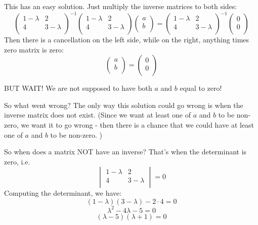\documentclass[12pt]{report}
\begin{document}
This has an easy solution. Just multiply the inverse matrices to both sides:
$$\begin{pmatrix} 1- \lambda &2 \\ 4& 3- \lambda\\ \end{pmatrix}^{-1} \begin{pmatrix} 1- \lambda &2 \\ 4& 3- \lambda\\ \end{pmatrix} \begin{pmatrix} a \\ b\\ \end{pmatrix} =  \begin{pmatrix} 1- \lambda &2 \\ 4& 3- \lambda\\ \end{pmatrix}^{-1} \begin{pmatrix} 0 \\ 0\\ \end{pmatrix} $$
Then there is a cancellation on the left side, while on the right, anything times zero matrix is zero:
$$\begin{pmatrix} a \\ b\\ \end{pmatrix} =  \begin{pmatrix} 0 \\ 0\\ \end{pmatrix} $$

BUT WAIT! We are not supposed to have both $a$ and $b$ equal to zero!

So what went wrong? The only way this solution could go wrong is when the inverse matrix does not exist. (Since we want at least one of $a$ and $b$ to be non-zero, we want it to go wrong - then there is a chance that we could have at least one of $a$ and $b$ to be non-zero. )

So when does a matrix NOT have an inverse? That's when the determinant is zero, i.e.
$$\begin{vmatrix} 1- \lambda &2 \\ 4& 3- \lambda\\ \end{vmatrix}=0$$
Computing the determinant, we have:
$$(1- \lambda)(3- \lambda) - 2 \cdot 4 =0$$
$$ \lambda^2 - 4 \lambda -5 =0$$
$$ (\lambda -5)(\lambda +1) =0$$
\end{document}
